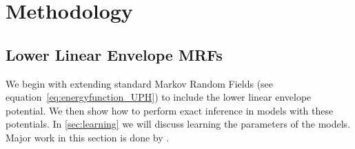 
\chapter{Methodology}
\label{cha:methodology}

\section{Lower Linear Envelope MRFs}
\label{sec:inference}

We begin with extending standard Markov Random Fields (see
equation~\eqref{eq:energyfunction_UPH}) to include the lower
linear envelope potential. We then show how to perform exact
inference in models with these potentials. In \ref{sec:learning}
we will discuss learning the parameters of the models. Major
work in this section is done by .



